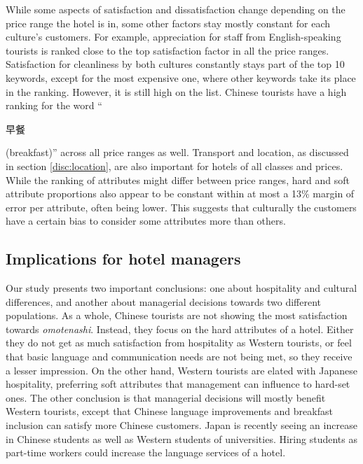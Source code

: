 \documentclass[smallextended,natbib]{svjour3}       %
\begin{document}
    While some aspects of satisfaction and dissatisfaction change depending on the price range the hotel is in, some other factors stay mostly constant for each culture's customers. For example, appreciation for staff from English-speaking tourists is ranked close to the top satisfaction factor in all the price ranges. Satisfaction for cleanliness by both cultures constantly stays part of the top 10 keywords, except for the most expensive one, where other keywords take its place in the ranking. However, it is still high on the list. Chinese tourists have a high ranking for the word ``\begin{CJK}{UTF8}{gbsn}早餐\end{CJK} (breakfast)'' across all price ranges as well. Transport and location, as discussed in section \ref{disc:location}, are also important for hotels of all classes and prices. While the ranking of attributes might differ between price ranges, hard and soft attribute proportions also appear to be constant within at most a 13\% margin of error per attribute, often being lower. This suggests that culturally the customers have a certain bias to consider some attributes more than others.

  \subsection{Implications for hotel managers}\label{disc:implications}

    Our study presents two important conclusions: one about hospitality and cultural differences, and another about managerial decisions towards two different populations. As a whole, Chinese tourists are not showing the most satisfaction towards \textit{omotenashi}. Instead, they focus on the hard attributes of a hotel. Either they do not get as much satisfaction from hospitality as Western tourists, or feel that basic language and communication needs are not being met, so they receive a lesser impression. On the other hand, Western tourists are elated with Japanese hospitality, preferring soft attributes that management can influence to hard-set ones. The other conclusion is that managerial decisions will mostly benefit Western tourists, except that Chinese language improvements and breakfast inclusion can satisfy more Chinese customers. Japan is recently seeing an increase in Chinese students as well as Western students of universities. Hiring students as part-time workers could increase the language services of a hotel.
\end{document}
